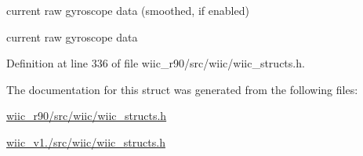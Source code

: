 current raw gyroscope data (smoothed, if enabled) 

current raw gyroscope data 

Definition at line 336 of file wiic\-\_\-r90/src/wiic/wiic\-\_\-structs.\-h.



The documentation for this struct was generated from the following files\-:\begin{DoxyCompactItemize}
\item 
\hyperlink{wiic__r90_2src_2wiic_2wiic__structs_8h}{wiic\-\_\-r90/src/wiic/wiic\-\_\-structs.\-h}\item 
\hyperlink{wiic__v1_81_2src_2wiic_2wiic__structs_8h}{wiic\-\_\-v1./src/wiic/wiic\-\_\-structs.\-h}\end{DoxyCompactItemize}
